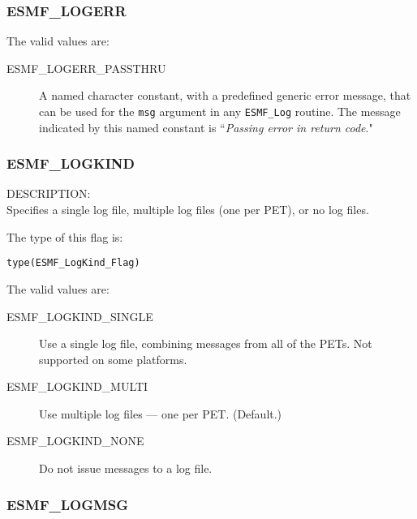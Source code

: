 

\subsubsection{ESMF\_LOGERR}
\label{const:logerr}

The valid values are:
\begin{description}
	\item [ESMF\_LOGERR\_PASSTHRU]
		A named character constant, with a predefined generic error message, 
		that can be used for the {\tt msg} argument in any {\tt ESMF\_Log} 
		routine.  The message indicated 
		by this named constant is ``{\it Passing error in return code}."
\end{description}

\subsubsection{ESMF\_LOGKIND}
\label{const:logkindflag}

{\sf DESCRIPTION:\\}
Specifies a single log file, multiple log files (one per PET), or no log files.

The type of this flag is:

{\tt type(ESMF\_LogKind\_Flag)}

The valid values are:
\begin{description}
   \item [ESMF\_LOGKIND\_SINGLE] 
         Use a single log file, combining messages from all of the PETs.  Not supported on some platforms.
   \item [ESMF\_LOGKIND\_MULTI]
         Use multiple log files --- one per PET.  (Default.)
   \item [ESMF\_LOGKIND\_NONE]
         Do not issue messages to a log file.
\end{description}

\subsubsection{ESMF\_LOGMSG}
\label{const:logmsgflag}

